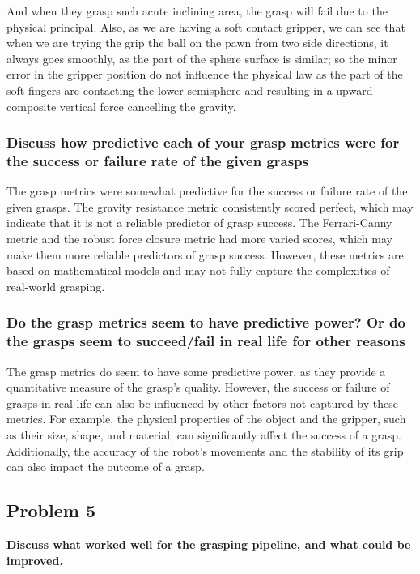 \documentclass{article}
\begin{document}
\begin{multicols}{2}
And when they grasp such acute inclining area, the grasp will fail due to the physical principal. Also, as we are having a soft contact gripper, we can see that when we are trying the grip the ball on the pawn from two side directions, it always goes smoothly, as the part of the sphere surface is similar; so the minor error in the gripper position do not influence the physical law as the part of the soft fingers are contacting the lower semisphere and resulting in a upward composite vertical force cancelling the gravity.    

\subsubsection{Discuss how predictive each of your grasp metrics were for the success or failure rate of the given grasps}

 The grasp metrics were somewhat predictive for the success or failure rate of the given grasps. The gravity resistance metric consistently scored perfect, which may indicate that it is not a reliable predictor of grasp success. The Ferrari-Canny metric and the robust force closure metric had more varied scores, which may make them more reliable predictors of grasp success. However, these metrics are based on mathematical models and may not fully capture the complexities of real-world grasping.


\subsubsection{Do the grasp metrics seem to have predictive power? Or do the grasps seem to succeed/fail in real life for other reasons}

The grasp metrics do seem to have some predictive power, as they provide a quantitative measure of the grasp's quality. However, the success or failure of grasps in real life can also be influenced by other factors not captured by these metrics. For example, the physical properties of the object and the gripper, such as their size, shape, and material, can significantly affect the success of a grasp. Additionally, the accuracy of the robot's movements and the stability of its grip can also impact the outcome of a grasp.

\subsection{Problem 5}
\textbf{Discuss what worked well for the grasping pipeline, and what could be improved.}



\end{multicols}
\end{document}
